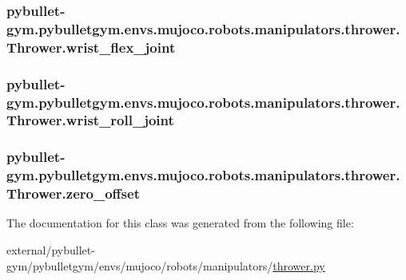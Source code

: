 \subsubsection[{\texorpdfstring{wrist\+\_\+flex\+\_\+joint}{wrist_flex_joint}}]{\setlength{\rightskip}{0pt plus 5cm}pybullet-\/gym.\+pybulletgym.\+envs.\+mujoco.\+robots.\+manipulators.\+thrower.\+Thrower.\+wrist\+\_\+flex\+\_\+joint}\hypertarget{classpybullet-gym_1_1pybulletgym_1_1envs_1_1mujoco_1_1robots_1_1manipulators_1_1thrower_1_1_thrower_a146992508c02bd0e26caa9a0755fc3a0}{}\label{classpybullet-gym_1_1pybulletgym_1_1envs_1_1mujoco_1_1robots_1_1manipulators_1_1thrower_1_1_thrower_a146992508c02bd0e26caa9a0755fc3a0}
\subsubsection[{\texorpdfstring{wrist\+\_\+roll\+\_\+joint}{wrist_roll_joint}}]{\setlength{\rightskip}{0pt plus 5cm}pybullet-\/gym.\+pybulletgym.\+envs.\+mujoco.\+robots.\+manipulators.\+thrower.\+Thrower.\+wrist\+\_\+roll\+\_\+joint}\hypertarget{classpybullet-gym_1_1pybulletgym_1_1envs_1_1mujoco_1_1robots_1_1manipulators_1_1thrower_1_1_thrower_a1009ed1d670ecaab35c6bbcc5e883605}{}\label{classpybullet-gym_1_1pybulletgym_1_1envs_1_1mujoco_1_1robots_1_1manipulators_1_1thrower_1_1_thrower_a1009ed1d670ecaab35c6bbcc5e883605}
\subsubsection[{\texorpdfstring{zero\+\_\+offset}{zero_offset}}]{\setlength{\rightskip}{0pt plus 5cm}pybullet-\/gym.\+pybulletgym.\+envs.\+mujoco.\+robots.\+manipulators.\+thrower.\+Thrower.\+zero\+\_\+offset}\hypertarget{classpybullet-gym_1_1pybulletgym_1_1envs_1_1mujoco_1_1robots_1_1manipulators_1_1thrower_1_1_thrower_af1c6fb5ae713dc062406007477af0017}{}\label{classpybullet-gym_1_1pybulletgym_1_1envs_1_1mujoco_1_1robots_1_1manipulators_1_1thrower_1_1_thrower_af1c6fb5ae713dc062406007477af0017}


The documentation for this class was generated from the following file\+:\begin{DoxyCompactItemize}
\item 
external/pybullet-\/gym/pybulletgym/envs/mujoco/robots/manipulators/\hyperlink{mujoco_2robots_2manipulators_2thrower_8py}{thrower.\+py}\end{DoxyCompactItemize}
